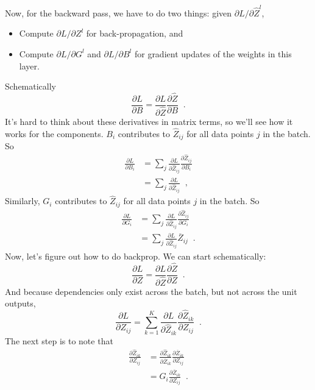 Now, for the backward pass, we have to do two things:  given
$\partial L / \partial \widehat{Z}^l$,
\begin{itemize}
  \item Compute $\partial L / \partial Z^l$ for back-propagation, and
  \item Compute $\partial L / \partial G^l$ and $\partial L / \partial
          B^l$ for gradient updates of the weights in this layer.
\end{itemize}

Schematically
\[\frac{\partial L}{\partial B} = \frac{\partial L}{\partial
    \widehat{Z}}\frac{\partial \widehat{Z}}{\partial B}\;\;.\]
It's hard to think about these derivatives in matrix terms, so we'll
see how it works for the components.
$B_i$ contributes to $\widehat{Z}_{ij}$ for all data points $j$ in the
batch.  So
\begin{align*}
  \frac{\partial L}{\partial B_i} & =
  \sum_j \frac{\partial L}{\partial \widehat{Z}_{ij}}
  \frac{\partial \widehat{Z}_{ij}}{\partial B_i}                                               \\
                                  & = \sum_j \frac{\partial L}{\partial \widehat{Z}_{ij}}\;\;,
\end{align*}
Similarly, $G_i$ contributes to $\widehat{Z}_{ij}$ for all data points
$j$ in the batch.  So
\begin{align*}
  \frac{\partial L}{\partial G_i} & =
  \sum_j \frac{\partial L}{\partial \widehat{Z}_{ij}}
  \frac{\partial \widehat{Z}_{ij}}{\partial G_i}                                                                  \\
                                  & =  \sum_j \frac{\partial L}{\partial \widehat{Z}_{ij}} \overline{Z}_{ij}\;\;.
\end{align*}
Now, let's figure out how to do backprop.  We can start schematically:
\[\frac{\partial L}{\partial Z} = \frac{\partial L}{\partial \widehat{Z}}
  \frac{\partial \widehat{Z}}{\partial Z}\;\;.\]
And because dependencies only exist across the batch, but not across
the unit outputs,
\[\frac{\partial L}{\partial Z_{ij}} =
  \sum_{k=1}^K\frac{\partial L}{\partial \widehat{Z}_{ik}}
  \frac{\partial \widehat{Z}_{ik}}{\partial Z_{ij}}\;\;.\]
The next step is to note that
\begin{align*}
  \frac{\partial \widehat{Z}_{ik}}{\partial Z_{ij}} & =
  \frac{\partial \widehat{Z}_{ik}}{\partial \overline{Z}_{ik}}
  \frac{\partial \overline{Z}_{ik}}{\partial Z_{ij}}                                                                \\
                                                    & = G_i \frac{\partial \overline{Z}_{ik}}{\partial Z_{ij}}\;\;.
\end{align*}
